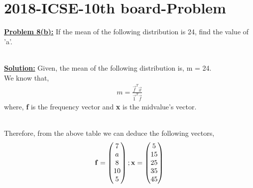 \documentclass[journal,12pt,twocolumn]{IEEEtran}
\begin{document}
	\section{2018-ICSE-10th board-Problem}
\textbf{\underline{Problem 8(b):}} If the mean of the following distribution is 24, find the value of 'a'.
	\begin{table}[htb]
		\centering
	\end{table}\\
	\textbf{\underline{Solution:} }Given, the mean of the following distribution is, m = 24.\\
	We know that,
    \begin{align} \label{eqn:1.1}
	    m = \frac{\vec{f}^T\vec{x}}{\vec{1}^T\vec{f}}
    \end{align} 
where, \textbf{f} is the frequency vector and \textbf{x} is the midvalue's vector. 
	\begin{table}[h!]
	\centering
\end{table}
\\
Therefore, from the above table we can deduce the following vectors,
	\begin{align} \label{eqn}
		\mathbf{f} = \begin{pmatrix}7\\a\\8\\10\\5\end{pmatrix}
		; 
	\mathbf{x} = \begin{pmatrix}5\\15\\25\\35\\45\end{pmatrix} 
	\end{align}
\end{document}
